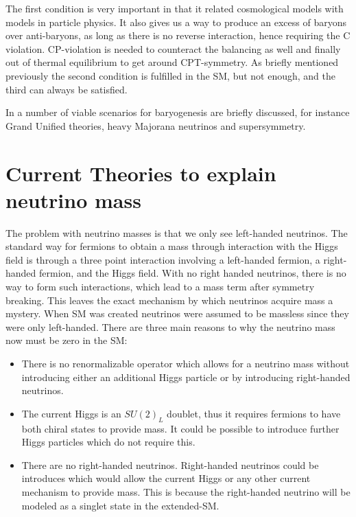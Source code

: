 The first condition is very important in that it related cosmological models with models in particle physics. It also gives us a way to produce an excess of baryons over anti-baryons, as long as there is no reverse interaction, hence requiring the C violation. CP-violation is needed to counteract the balancing as well and finally out of thermal equilibrium to get around CPT-symmetry. As briefly mentioned previously the second condition is fulfilled in the SM, but not enough, and the third can always be satisfied.

In \cite{36CRC} a number of viable scenarios for baryogenesis are briefly discussed, for instance Grand Unified theories, heavy Majorana neutrinos and supersymmetry.

\section{Current Theories to explain neutrino mass}
The problem with neutrino masses is that we only see left-handed neutrinos. The standard way for fermions to obtain a mass through interaction with the Higgs field is through a three point interaction involving a left-handed fermion, a right-handed fermion, and the Higgs field. With no right handed neutrinos, there is no way to form such interactions, which lead to a mass term after symmetry breaking. This leaves the exact mechanism by which neutrinos acquire mass a mystery. When SM was created neutrinos were assumed to be massless since they were only left-handed. There are three main reasons to why the neutrino mass now must be zero in the SM:
\begin{itemize}
\item There is no renormalizable operator which allows for a neutrino mass without introducing either an additional Higgs particle or by introducing right-handed neutrinos.

\item The current Higgs is an $SU(2)_L$ doublet, thus it requires fermions to have both chiral states to provide mass. It could be possible to introduce further Higgs particles which do not require this.

\item There are no right-handed neutrinos. Right-handed neutrinos could be introduces which would allow the current Higgs or any other current mechanism to provide mass. This is because the right-handed neutrino will be modeled as a singlet state in the extended-SM.
\end{itemize}

